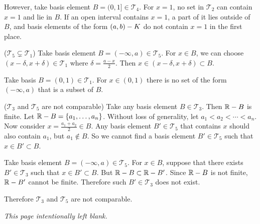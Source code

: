 \documentclass[a4paper,11pt]{article}
\newcommand{\T}{\mathcal{T}}
\begin{document}
\begin{minipage}[t][270mm]{90mm}
    \smallskip

    However, take basis element \(B = (0, 1] \in \T_4\). For \(x = 1\), no set in \(\T_2\) can contain \(x = 1\) and lie in \(B\). If an open interval contains \(x = 1\), a part of it lies outside of \(B\), and basis elements of the form \((a, b) - K\) do not contain \(x = 1\) in the first place.

    \bigskip

    (\(\T_5 \subsetneq \T_1\)) Take basis element \(B = (-\infty, a) \in \T_5\). For \(x \in B\), we can choose \((x - \delta, x + \delta) \in \T_1\) where \(\delta = \frac{a-x}{2}\). Then \(x \in (x - \delta, x + \delta) \subset B\).

    \smallskip

    Take basis \(B = (0, 1) \in \T_1\). For \(x \in (0, 1)\) there is no set of the form \((-\infty, a)\) that is a subset of \(B\).
\end{minipage}
{\color{gray}\vline}
\begin{minipage}[t][270mm]{90mm}
    (\(\T_3\) and \(\T_5\) are not comparable) Take any basis element \(B \in \T_3\). Then \(\mathbb{R} - B\) is finite. Let \(\mathbb{R} - B = \{a_1, \dots, a_n\}\). Without loss of generality, let \(a_1 < a_2 < \cdots < a_n\). Now consider \(x = \frac{a_1 + a_2}{2} \in B\). Any basis element \(B' \in \T_5\) that contains \(x\) should also contain \(a_1\), but \(a_1 \notin B\). So we cannot find a basis element \(B' \in \T_5\) such that \(x \in B' \subset B\).

    \smallskip

    Take basis element \(B = (-\infty, a) \in \T_5\). For \(x \in B\), suppose that there exists \(B' \in \T_3\) such that \(x \in B' \subset B\). But \(\mathbb{R} - B \subset \mathbb{R} - B'\). Since \(\mathbb{R} - B\) is not finite, \(\mathbb{R} - B'\) cannot be finite. Therefore such \(B' \in \T_3\) does not exist.

    Therefore \(\T_3\) and \(\T_5\) are not comparable.
\end{minipage}

\newpage

\phantom{?}
\vspace{5mm}

\begin{minipage}[t][270mm]{90mm}
    \phantom{?} \textit{This page intentionally left blank.}
\end{minipage}
{\color{gray}\vline}
\begin{minipage}[t][270mm]{90mm}
    \phantom{?}
\end{minipage}
\end{document}

